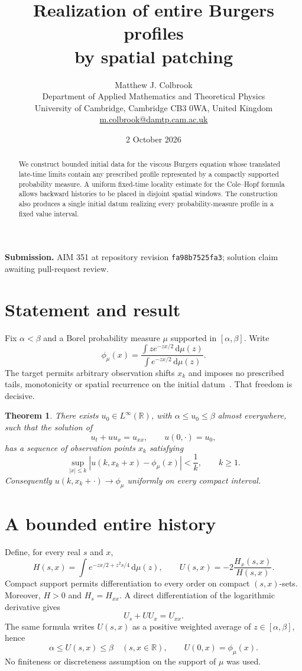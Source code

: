 \documentclass[11pt,a4paper]{article}
\title{\textbf{Realization of entire Burgers profiles\\by spatial patching}}
\author{Matthew J. Colbrook\\[3pt]
\small Department of Applied Mathematics and Theoretical Physics\\
\small University of Cambridge, Cambridge CB3 0WA, United Kingdom\\
\small \href{mailto:m.colbrook@damtp.cam.ac.uk}{m.colbrook@damtp.cam.ac.uk}}
\date{2 October 2026}
\numberwithin{equation}{section}
\newtheorem{theorem}{Theorem}[section]
\theoremstyle{remark}\newtheorem{remark}[theorem]{Remark}
\newcommand{\R}{\mathbb R}\newcommand{\C}{\mathbb C}\newcommand{\T}{\mathbb T}
\newcommand{\dd}{\,\mathrm d}
\begin{document}
\maketitle
\begin{abstract}
We construct bounded initial data for the viscous Burgers equation whose translated late-time limits contain any prescribed profile represented by a compactly supported probability measure. A uniform fixed-time locality estimate for the Cole--Hopf formula allows backward histories to be placed in disjoint spatial windows. The construction also produces a single initial datum realizing every probability-measure profile in a fixed value interval.
\end{abstract}
\smallskip
\noindent\textbf{Submission.} AIM 351 at repository revision \texttt{fa98b7525fa3}; solution claim awaiting pull-request review.

\section{Statement and result}\label{sec:burgers}

Fix $\alpha<\beta$ and a Borel probability measure $\mu$ supported in $[\alpha,\beta]$. Write
\begin{equation}\label{eq:profile}
 \phi_\mu(x)=\frac{\displaystyle\int z e^{-zx/2}\dd\mu(z)}
 {\displaystyle\int e^{-zx/2}\dd\mu(z)}.
\end{equation}
The target permits arbitrary observation shifts $x_k$ and imposes no prescribed tails, monotonicity or spatial recurrence on the initial datum~\cite{burgersentry,gs}. That freedom is decisive.

\begin{theorem}\label{thm:burgers}
There exists $u_0\in L^\infty(\R)$, with $\alpha\leq u_0\leq\beta$ almost everywhere, such that the solution of
\[
 u_t+u u_x=u_{xx},\qquad u(0,\cdot)=u_0,
\]
has a sequence of observation points $x_k$ satisfying
\[
 \sup_{|x|\leq k}|u(k,x_k+x)-\phi_\mu(x)|<\frac1k,
 \qquad k\geq1.
\]
Consequently $u(k,x_k+\cdot)\to\phi_\mu$ uniformly on every compact interval.
\end{theorem}

\section{A bounded entire history}
Define, for every real $s$ and $x$,
\begin{equation}\label{eq:entirehistory}
 H(s,x)=\int e^{-zx/2+z^2s/4}\dd\mu(z),\qquad
 U(s,x)=-2\frac{H_x(s,x)}{H(s,x)}.
\end{equation}
Compact support permits differentiation to every order on compact $(s,x)$-sets. Moreover, $H>0$ and $H_s=H_{xx}$. A direct differentiation of the logarithmic derivative gives
\[
 U_s+UU_x=U_{xx}.
\]
The same formula writes $U(s,x)$ as a positive weighted average of $z\in[\alpha,\beta]$, hence
\begin{equation}\label{eq:entirebounds}
 \alpha\leq U(s,x)\leq\beta \quad(s,x\in\R),
 \qquad U(0,x)=\phi_\mu(x).
\end{equation}
No finiteness or discreteness assumption on the support of $\mu$ was used.
\end{document}
